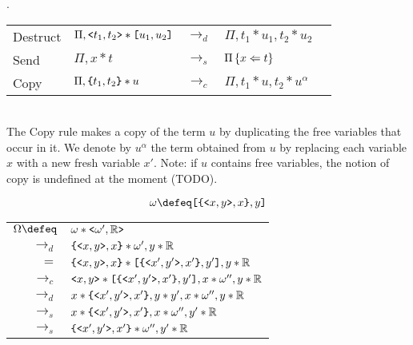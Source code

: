 \documentclass{article}
\begin{document}
\vspace{1em}
\begin{definition}.\\[1em]
\bgroup
\def\arraystretch{1.3}
\begin{tabular}{l l c l l}
   Destruct & $\Pi,\mbox{\texttt{<}} t_1, t_2\mbox{\texttt{>}} * \mbox{\texttt{[}}u_1, u_2\mbox{\texttt{]}}$ & $\to_d$ & $\Pi, t_1*u_1, t_2*u_2$ \\
   Send & $\Pi, x * t$ & $\to_s$ & $\Pi\left\{x \Leftarrow t\right\}$ \\
   Copy & $\Pi,\mbox{\texttt{\{}}t_1, t_2\mbox{\texttt{\}}} * u$ & $\to_c$ & $\Pi, t_1*u, t_2*u^\alpha$ \\
\end{tabular}\egroup\\

\noindent The Copy rule makes a copy of the term $u$ by
duplicating the free variables that occur in it.
We denote by $u^\alpha$ the term obtained from $u$ by replacing
each variable $x$ with a new fresh variable $x'$.
Note: if $u$ contains free variables, the notion of copy is
undefined at the moment (TODO).

\end{definition}

\begin{example}

\[\omega \defeq \cs{\contr{\ca{x}{y}, x}}{y}\]

\bgroup
\def\arraystretch{1.3}
\begin{tabular}{rl}
    $\Omega \defeq $ & $\omega * \mbox{\texttt{<}} \omega', \mathbb{R}\mbox{\texttt{>}}$ \\
    $\to_d$ & $\mbox{\texttt{\{}}\mbox{\texttt{<}} x, y\mbox{\texttt{>}}, x\mbox{\texttt{\}}} * \omega', y * \mathbb{R}$ \\
    $=$ & $\mbox{\texttt{\{}}\mbox{\texttt{<}} x, y\mbox{\texttt{>}}, x\mbox{\texttt{\}}} * \mbox{\texttt{[}}\mbox{\texttt{\{}}\mbox{\texttt{<}} x', y'\mbox{\texttt{>}}, x'\mbox{\texttt{\}}}, y'\mbox{\texttt{]}}, y * \mathbb{R}$ \\
    $\to_c$ & $\mbox{\texttt{<}} x, y\mbox{\texttt{>}} * \mbox{\texttt{[}}\mbox{\texttt{\{}}\mbox{\texttt{<}} x', y'\mbox{\texttt{>}}, x'\mbox{\texttt{\}}}, y'\mbox{\texttt{]}}, x * \omega'', y * \mathbb{R}$ \\
    $\to_d$ & $x * \mbox{\texttt{\{}}\mbox{\texttt{<}} x', y'\mbox{\texttt{>}}, x'\mbox{\texttt{\}}}, {y}*{y'}, x * \omega'', y * \mathbb{R}$ \\
    $\to_s$ & $x * \mbox{\texttt{\{}}\mbox{\texttt{<}} x', y'\mbox{\texttt{>}}, x'\mbox{\texttt{\}}}, x * \omega'', y' * \mathbb{R}$ \\
    $\to_s$ & $\mbox{\texttt{\{}}\mbox{\texttt{<}} x', y'\mbox{\texttt{>}}, x'\mbox{\texttt{\}}} * \omega'', y' * \mathbb{R}$ \\
\end{tabular}
\egroup
\end{example}
\end{document}
